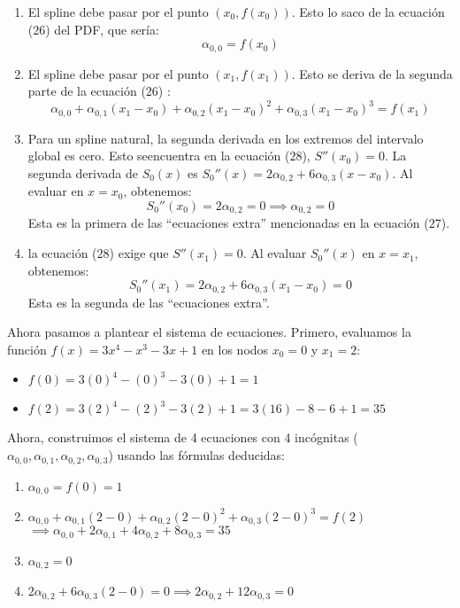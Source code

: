 \documentclass{article}
\begin{document}
\begin{enumerate}
    \item El spline debe pasar por el punto \((x_0, f(x_0))\). Esto lo saco de la ecuación ($26$) del PDF, que sería:
    $$ \alpha_{0,0} = f(x_0) $$

    \item El spline debe pasar por el punto \((x_1, f(x_1))\). Esto se deriva de la segunda parte de la ecuación ($26$) :
    $$ \alpha_{0,0} + \alpha_{0,1}(x_1-x_0) + \alpha_{0,2}(x_1-x_0)^2 + \alpha_{0,3}(x_1-x_0)^3 = f(x_1) $$

    \item Para un spline natural, la segunda derivada en los extremos del intervalo global es cero. Esto seencuentra en la ecuación ($28$), \(S''(x_0) = 0\). La segunda derivada de \(S_0(x)\) es \(S_0''(x) = 2\alpha_{0,2} + 6\alpha_{0,3}(x-x_0)\). Al evaluar en \(x=x_0\), obtenemos:
    $$ S_0''(x_0) = 2\alpha_{0,2} = 0 \implies \alpha_{0,2} = 0 $$
    Esta es la primera de las ``ecuaciones extra'' mencionadas en la ecuación ($27$).

    \item la ecuación ($28$) exige que \(S''(x_1) = 0\). Al evaluar \(S_0''(x)\) en \(x=x_1\), obtenemos:
    $$ S_0''(x_1) = 2\alpha_{0,2} + 6\alpha_{0,3}(x_1-x_0) = 0 $$
    Esta es la segunda de las ``ecuaciones extra''.
\end{enumerate}


Ahora pasamos a plantear el sistema de ecuaciones.
Primero, evaluamos la función \(f(x) = 3x^4 - x^3 - 3x + 1\) en los nodos \(x_0=0\) y \(x_1=2\):
\begin{itemize}
    \item \(f(0) = 3(0)^4 - (0)^3 - 3(0) + 1 = 1\)
    \item \(f(2) = 3(2)^4 - (2)^3 - 3(2) + 1 = 3(16) - 8 - 6 + 1 = 35\)
\end{itemize}

Ahora, construimos el sistema de 4 ecuaciones con 4 incógnitas (\(\alpha_{0,0}, \alpha_{0,1}, \alpha_{0,2}, \alpha_{0,3}\)) usando las fórmulas deducidas:
\begin{enumerate}
    \item \(\alpha_{0,0} = f(0) = 1\)
    \item \(\alpha_{0,0} + \alpha_{0,1}(2-0) + \alpha_{0,2}(2-0)^2 + \alpha_{0,3}(2-0)^3 = f(2)\) \\
    \(\implies \alpha_{0,0} + 2\alpha_{0,1} + 4\alpha_{0,2} + 8\alpha_{0,3} = 35\)
    \item \(\alpha_{0,2} = 0 \)
    \item \(2\alpha_{0,2} + 6\alpha_{0,3}(2-0) = 0 \implies 2\alpha_{0,2} + 12\alpha_{0,3} = 0\)
\end{enumerate}
\end{document}

